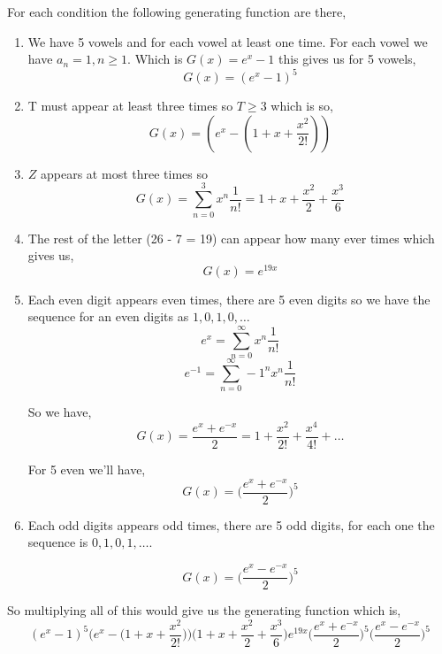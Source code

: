 \documentclass[a4paper]{report}
\begin{document}
For each condition the following generating function are there, 
\begin{enumerate}
\item We have 5 vowels and for each vowel at least one time. For each vowel we have $a_n = 1, n \ge 1$. Which is $G(x) = e^{x} - 1$ this gives us for 5 vowels,
$$ G(x) = (e^{x} - 1)^{5}$$ 
\item T must appear at least three times so $T \ge 3$ which is so, 
$$ G(x) = (e^{x} - (1 + x + \frac{x^2}{2!})) $$ 
\item $Z$ appears at most three times so $$G(x) = \sum_{n=0}^{3} x^{n}\frac{1}{n!} = 1 + x +\frac{x^2}{2} + \frac{x^{3}}{6}$$
\item The rest of the letter (26 - 7 = 19) can appear how many ever times which gives us, 
$$ G(x) = e^{19x} $$ 
\item Each even digit appears even times, there are 5 even digits so we have the sequence for an even digits as $1, 0, 1, 0, \dots$
$$ e^{x} = \sum_{n=0}^{\infty} x^{n} \frac{1}{n!} $$ 
$$ e^{-1} = \sum_{n=0}^{\infty} -1^{n}x^{n}\frac{1}{n!} $$ 

So we have, 
$$ G(x) = \frac{e^{x} + e^{-x}}{2} = 1 + \frac{x^2}{2!} + \frac{x^{4}}{4!} + \dots $$ 

For 5 even we'll have, 
$$ G(x) =  \bigg  (\frac{e^{x} + e^{-x}}{2}  \bigg )^{5}$$ 
\item Each odd digits appears odd times, there are 5 odd digits, for each one the sequence is $0, 1, 0, 1, \dots$. 

$$ G(x) =  \bigg  (\frac{e^{x} - e^{-x}}{2}  \bigg )^{5}$$ 
\end{enumerate}

So multiplying all of this would give us the generating function which is, 
$$ (e^{x} - 1)^{5}\bigg (e^{x} - \bigg (1 + x + \frac{x^2}{2!} \bigg) \bigg) \bigg ( 1 + x +\frac{x^2}{2} + \frac{x^{3}}{6} \bigg) e^{19x}  \bigg  (\frac{e^{x} + e^{-x}}{2}  \bigg )^{5}  \bigg  (\frac{e^{x} - e^{-x}}{2}  \bigg )^{5}$$ 
\end{document}

